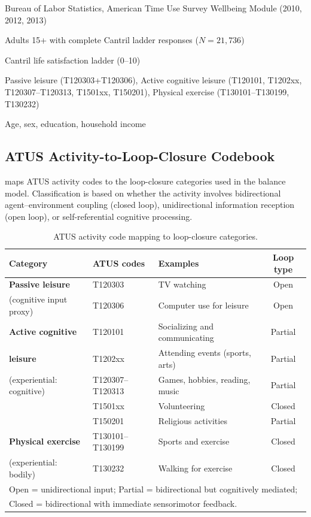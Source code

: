\documentclass[a4paper,11pt,titlepage]{article}
\begin{document}
\begin{description}[leftmargin=2em]
\item[Data source:] Bureau of Labor Statistics, American Time Use Survey Wellbeing Module (2010, 2012, 2013)
\item[Sample:] Adults 15+ with complete Cantril ladder responses ($N = 21{,}736$)
\item[Outcome:] Cantril life satisfaction ladder (0--10)
\item[Activity classification:] Passive leisure (T120303+T120306), Active cognitive leisure (T120101, T1202xx, T120307--T120313, T1501xx, T150201), Physical exercise (T130101--T130199, T130232)
\item[Covariates:] Age, sex, education, household income
\end{description}

\subsection{ATUS Activity-to-Loop-Closure Codebook}\label{app:codebook}

 maps ATUS activity codes to the loop-closure categories used in the balance model. Classification is based on whether the activity involves bidirectional agent--environment coupling (closed loop), unidirectional information reception (open loop), or self-referential cognitive processing.

\begin{table}[htbp]
\centering
\caption{ATUS activity code mapping to loop-closure categories.}
\label{tab:atus-codebook}
\small
\begin{tabular}{lllc}
\toprule
Category & ATUS codes & Examples & Loop type \\
\midrule
\textbf{Passive leisure} & T120303 & TV watching & Open \\
(cognitive input proxy) & T120306 & Computer use for leisure & Open \\
\midrule
\textbf{Active cognitive} & T120101 & Socializing and communicating & Partial \\
\textbf{leisure} & T1202xx & Attending events (sports, arts) & Partial \\
(experiential: cognitive) & T120307--T120313 & Games, hobbies, reading, music & Partial \\
& T1501xx & Volunteering & Closed \\
& T150201 & Religious activities & Partial \\
\midrule
\textbf{Physical exercise} & T130101--T130199 & Sports and exercise & Closed \\
(experiential: bodily) & T130232 & Walking for exercise & Closed \\
\bottomrule
\multicolumn{4}{l}{\scriptsize Open = unidirectional input; Partial = bidirectional but cognitively mediated;} \\
\multicolumn{4}{l}{\scriptsize Closed = bidirectional with immediate sensorimotor feedback.}
\end{tabular}
\end{table}
\end{document}
